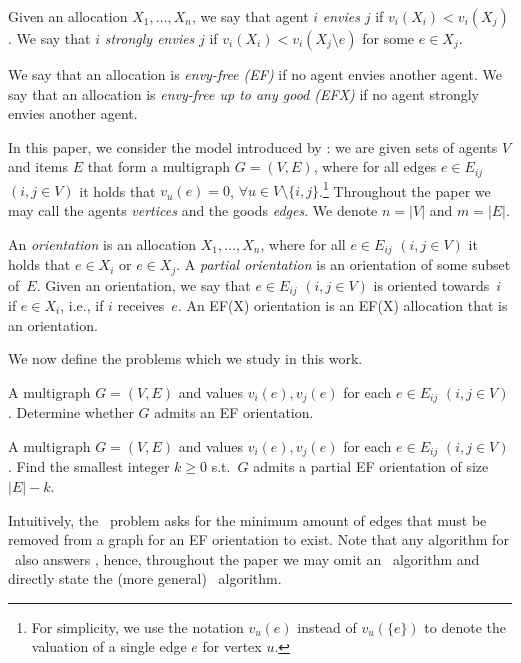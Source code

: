 \documentclass[11pt,letterpaper]{article}
\begin{document}
\begin{definition}[Envy]\label{def:envy}
    Given an allocation $X_1,\ldots,X_n$, we say that agent $i$ \emph{envies} $j$ if
    $v_i(X_i) < v_i(X_j)$. We say that $i$ \emph{strongly envies} $j$ if $v_i(X_i) < v_i(X_j \setminus e)$ for some $e \in X_j$.
\end{definition}

\begin{definition}\label{def:fair_alloc}
    We say that an allocation is \emph{envy-free (EF)} if no agent envies another agent. We say that an allocation is \emph{envy-free up to any good (EFX)} if no agent strongly envies another agent. 
\end{definition}






In this paper, we consider the model introduced by \cite{EFXgraphs}: we are given sets of agents $V$ and items $E$ that form a multigraph $G=(V,E)$, where for all edges $e\in E_{ij}$ $(i,j \in V)$ it holds that $v_u(e)=0$, $\forall u\in V\setminus\{i,j\}$.\footnote{For simplicity, we use the notation $v_u(e)$ instead of $v_u(\{e\})$ to denote the valuation of a single edge $e$ for vertex $u$.} Throughout the paper we may call the agents \textit{vertices} and the goods \textit{edges}. We denote $n=|V|$ and $m=|E|$.




An \emph{orientation} is an allocation $X_1,\ldots,X_n$, where for all $e\in E_{ij}$ $(i,j \in V)$ it holds that $e\in X_i$ or $e\in X_j$. A \emph{partial orientation} is an orientation of some subset of~$E$. Given an orientation, we say that $e\in E_{ij}$ $(i,j \in V)$ is oriented towards~$i$ if $e\in X_i$, i.e., if $i$ receives~$e$. An EF(X) orientation is an EF(X) allocation that is an orientation.






We now define the problems which we study in this work.

{A multigraph $G=(V,E)$ and values $v_i(e), v_j(e)$ for each $e\in E_{ij}$ $(i,j \in V)$.}
{Determine whether $G$ admits an EF orientation.}\label{def:EFo}

{A multigraph $G=(V,E)$ and values $v_i(e), v_j(e)$ for each $e\in E_{ij}$ $(i,j \in V)$.}
{Find the smallest integer $k\geq 0$ s.t.~$G$ admits a partial EF orientation of size $|E|-k$.} \label{def:mc_EFo}

Intuitively, the \EFmc\ problem asks for the minimum amount of edges that must be removed from a graph for an EF orientation to exist. Note that any algorithm for \EFmc\ also answers \EFo, hence, throughout the paper we may omit an \EFo\ algorithm and directly state the (more general) \EFmc\ algorithm.
\end{document}
